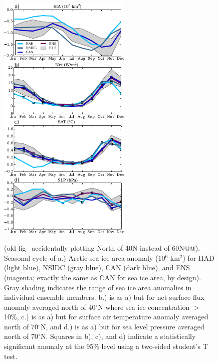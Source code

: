 \documentclass[twocol]{ametsoc}
\begin{document}
\begin{figure}[t]
  \noindent\includegraphics[width=15pc,angle=0]{seacycles.pdf}\\
  \caption{(old fig-- accidentally plotting North of 40N instead of 60N@@). Seasonal cycle of a.) Arctic sea ice area anomaly (10$^6$ km$^2$) for HAD (light blue), NSIDC (gray blue), CAN (dark blue), and ENS (magenta; exactly the same as CAN for sea ice area, by design). Gray shading indicates the range of sea ice area anomalies in individual ensemble members. b.) is as a) but for net surface flux anomaly averaged north of 40$^\circ$N where sea ice concentration $>$ 10\%, c.) is as a) but for surface air temperature anomaly averaged north of 70$^\circ$N, and d.) is as a) but for sea level pressure averaged north of 70$^\circ$N. Squares in b), c), and d) indicate a statistically significant anomaly at the 95\% level using a two-sided student's T test.
}\label{fig:fig2}
\end{figure}
\end{document}
